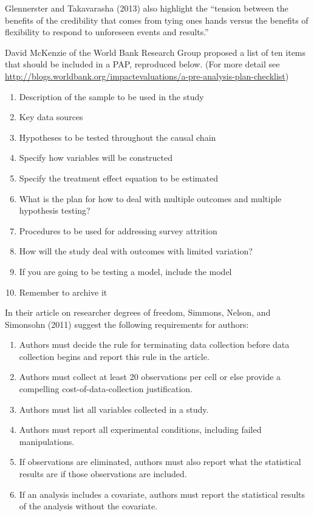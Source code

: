 \documentclass[12pt] {article}
\begin{document}
Glennerster and Takavarasha (2013) also highlight the ``tension between
the benefits of the credibility that comes from tying ones hands versus
the benefits of flexibility to respond to unforeseen events and
results.''

David McKenzie of the World Bank Research Group proposed a list of ten
items that should be included in a PAP, reproduced below. (For more
detail see
\url{http://blogs.worldbank.org/impactevaluations/a-pre-analysis-plan-checklist})

\begin{enumerate}
\item
  Description of the sample to be used in the study
\item
  Key data sources
\item
  Hypotheses to be tested throughout the causal chain
\item
  Specify how variables will be constructed
\item
  Specify the treatment effect equation to be estimated
\item
  What is the plan for how to deal with multiple outcomes and multiple
  hypothesis testing?
\item
  Procedures to be used for addressing survey attrition
\item
  How will the study deal with outcomes with limited variation?
\item
  If you are going to be testing a model, include the model
\item
  Remember to archive it
\end{enumerate}

In their article on researcher degrees of freedom, Simmons, Nelson, and
Simonsohn (2011) suggest the following requirements for authors:

\begin{enumerate}
\def\labelenumi{\arabic{enumi}.}
\item
  Authors must decide the rule for terminating data collection before
  data collection begins and report this rule in the article.
\item
  Authors must collect at least 20 observations per cell or else provide
  a compelling cost-of-data-collection justification.
\item
  Authors must list all variables collected in a study.
\item
  Authors must report all experimental conditions, including failed
  manipulations.
\item
  If observations are eliminated, authors must also report what the
  statistical results are if those observations are included.
\item
  If an analysis includes a covariate, authors must report the
  statistical results of the analysis without the covariate.
\end{enumerate}
\end{document}
